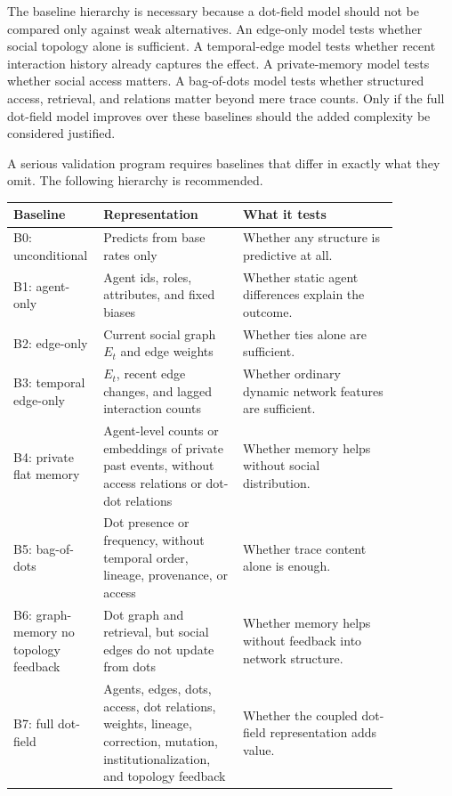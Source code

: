 \documentclass[11pt]{article}
\theoremstyle{remark}
\begin{document}
The baseline hierarchy is necessary because a dot-field model should not be compared only against weak alternatives. An edge-only model tests whether social topology alone is sufficient. A temporal-edge model tests whether recent interaction history already captures the effect. A private-memory model tests whether social access matters. A bag-of-dots model tests whether structured access, retrieval, and relations matter beyond mere trace counts. Only if the full dot-field model improves over these baselines should the added complexity be considered justified.


A serious validation program requires baselines that differ in exactly what
they omit. The following hierarchy is recommended.

\begin{longtable}[]{@{}
  >{\raggedright\arraybackslash}p{0.14\linewidth}
  >{\raggedright\arraybackslash}p{0.34\linewidth}
  >{\raggedright\arraybackslash}p{0.38\linewidth}@{}}
\toprule
Baseline & Representation & What it tests \\
\midrule
\endhead
\bottomrule
\endlastfoot
B0: unconditional & Predicts from base rates only & Whether any structure is
predictive at all. \\
B1: agent-only & Agent ids, roles, attributes, and fixed biases & Whether
static agent differences explain the outcome. \\
B2: edge-only & Current social graph \(E_t\) and edge weights & Whether ties
alone are sufficient. \\
B3: temporal edge-only & \(E_t\), recent edge changes, and lagged interaction
counts & Whether ordinary dynamic network features are sufficient. \\
B4: private flat memory & Agent-level counts or embeddings of private past
events, without access relations or dot-dot relations & Whether memory helps
without social distribution. \\
B5: bag-of-dots & Dot presence or frequency, without temporal order, lineage,
provenance, or access & Whether trace content alone is enough. \\
B6: graph-memory no topology feedback & Dot graph and retrieval, but social
edges do not update from dots & Whether memory helps without feedback into
network structure. \\
B7: full dot-field & Agents, edges, dots, access, dot relations, weights,
lineage, correction, mutation, institutionalization, and topology feedback &
Whether the coupled dot-field representation adds value. \\
\end{longtable}
\end{document}
